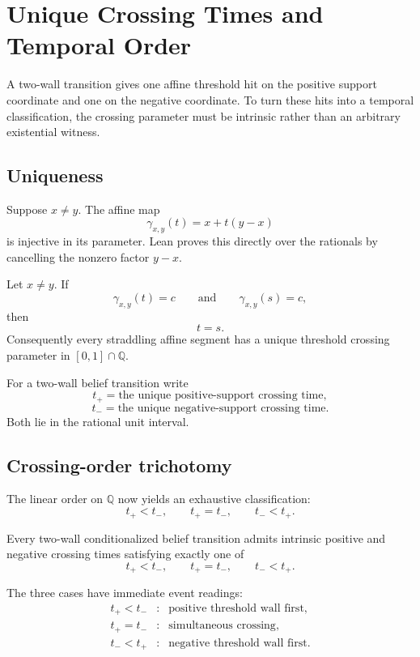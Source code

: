 \section{Unique Crossing Times and Temporal Order}
\label{sec:crossing-order}

A two-wall transition gives one affine threshold hit on the positive support coordinate and one on the negative coordinate. To turn these hits into a temporal classification, the crossing parameter must be intrinsic rather than an arbitrary existential witness.

\subsection{Uniqueness}

Suppose \(x\neq y\). The affine map
\[
  \gamma_{x,y}(t)=x+t(y-x)
\]
is injective in its parameter. Lean proves this directly over the rationals by cancelling the nonzero factor \(y-x\).

\begin{theorem}
Let \(x\neq y\). If
\[
  \gamma_{x,y}(t)=c
  \qquad\text{and}\qquad
  \gamma_{x,y}(s)=c,
\]
then
\[
  t=s.
\]
Consequently every straddling affine segment has a unique threshold crossing parameter in \([0,1]\cap\mathbb{Q}\).
\statusverified
\end{theorem}

For a two-wall belief transition write
\[
  t_+=\text{the unique positive-support crossing time},
\]
\[
  t_-=\text{the unique negative-support crossing time}.
\]
Both lie in the rational unit interval.

\subsection{Crossing-order trichotomy}

The linear order on \(\mathbb{Q}\) now yields an exhaustive classification:
\[
  t_+<t_-,
  \qquad
  t_+=t_-,
  \qquad
  t_-<t_+.
\]

\begin{theorem}
Every two-wall conditionalized belief transition admits intrinsic positive and negative crossing times satisfying exactly one of
\[
  t_+<t_-,\qquad
  t_+=t_-,\qquad
  t_-<t_+.
\]
\statusverified
\end{theorem}

The three cases have immediate event readings:
\[
\begin{array}{ccl}
 t_+<t_- &:& \text{positive threshold wall first},\\
 t_+=t_- &:& \text{simultaneous crossing},\\
 t_-<t_+ &:& \text{negative threshold wall first}.
\end{array}
\]

